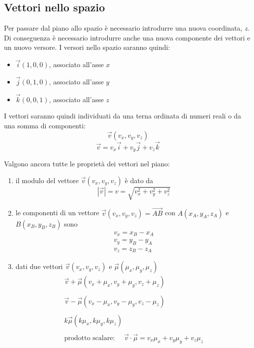 \documentclass{article}     %
\begin{document}
        \subsection{Vettori nello spazio}
            Per passare dal piano allo spazio è necessario introdurre una nuova coordinata, $z$. Di conseguenza è necessario introdurre anche una nuova componente dei vettori e un nuovo versore. I versori nello spazio saranno quindi:
            \begin{itemize}
                \item $\overrightarrow{i}(1,0,0)$, associato all'asse $x$
                \item $\overrightarrow{j}(0,1,0)$, associato all'asse $y$
                \item $\overrightarrow{k}(0,0,1)$, associato all'asse $z$
            \end{itemize}
            I vettori saranno quindi individuati da una terna ordinata di numeri reali o da una somma di componenti:
            \[\overrightarrow{v}(v_x, v_y, v_z)\]
            \[\overrightarrow{v}=v_x\overrightarrow{i}+v_y\overrightarrow{j}+v_z\overrightarrow{k}\]

            Valgono ancora tutte le proprietà dei vettori nel piano:

            \renewcommand{\labelenumi}{\alph{enumi})}
            \begin{enumerate}
                \item il modulo del vettore $\overrightarrow{v}(v_x, v_y, v_z)$ è dato da \[|\overrightarrow{v}|=v=\sqrt{v_x^2+v_y^2+v_z^2}\]
                \item le componenti di un vettore $\overrightarrow{v}(v_x, v_y, v_z)=\overrightarrow{AB}$ con $A(x_A,y_A,z_A)$ e $B(x_B,y_B,z_B)$ sono 
                \[\begin{array}{c}
                    v_x=x_B-x_A\\
                    v_y=y_B-y_A\\
                    v_z=z_B-z_A
                \end{array}\]
                \item dati due vettori $\overrightarrow{v}(v_x, v_y, v_z)$ e $\overrightarrow{\mu}(\mu_x, \mu_y, \mu_z)$ 
                    \[\begin{array}{c}
                        \overrightarrow{v}+\overrightarrow{\mu}(v_x+\mu_x, v_y+\mu_y, v_z+\mu_z)\\ \\
                        \overrightarrow{v}-\overrightarrow{\mu}(v_x-\mu_x, v_y-\mu_y, v_z-\mu_z)\\ \\
                        k\overrightarrow{\mu}(k\mu_x, k\mu_y, k\mu_z)\\ \\
                        \text{prodotto scalare:~~~~} \overrightarrow{v}\cdot\overrightarrow{\mu}=v_x\mu_x + v_y\mu_y+v_z\mu_z
                    \end{array}\]
            \end{enumerate}
            \renewcommand{\labelenumi}{\arabic{enumi}.} %
            
\end{document}
